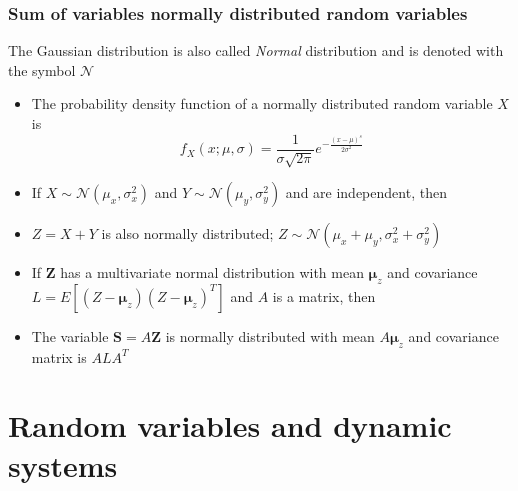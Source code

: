 \begin{frame}
	\frametitle{Sum of variables normally distributed random variables}
	The Gaussian distribution is also called \emph{Normal} distribution and is denoted with the symbol $\mathcal{N}$\vspace{0.5em}
	
	\begin{itemize}
		\item The probability density function of a normally distributed random variable $X$ is
		$$f_X(x;\mu,\sigma)=\frac{1}{\sigma\sqrt{2\pi}}e^{-\frac{(x-\mu)^s}{2\sigma^2}}$$
		\item <2-> If $X\sim\mathcal{N}(\mu_x, \sigma_x^2)$ and $Y\sim\mathcal{N}(\mu_y, \sigma_y^2)$ and are independent, then
		\item <2-> $Z=X+Y$ is also normally distributed;\vspace{1em} $Z\sim\mathcal{N}(\mu_x+\mu_y, \sigma_x^2+\sigma_y^2)$
	
		\item <3-> If $\bm{Z}$  has a multivariate normal distribution with mean $\bm{\mu}_z$ and covariance $L=E[(Z-\bm{\mu}_z)(Z-\bm{\mu}_z)^T]$
		and $A$ is a matrix, then
		\item <3-> The variable $\bm{S}=A\bm{Z}$ is normally distributed with mean $A \bm{\mu}_z$ and covariance matrix is $ALA^T$
	\end{itemize} 
\end{frame}

\section{Random variables and dynamic systems}
\separatorslide

